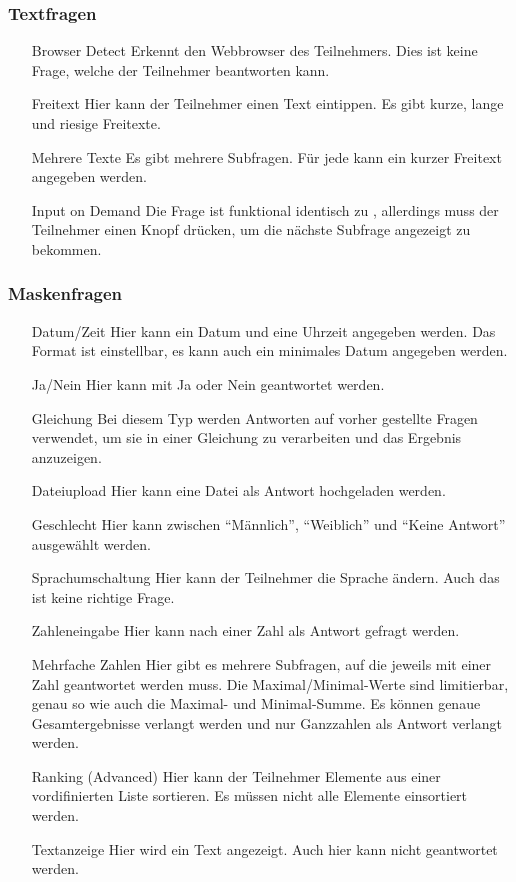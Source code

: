 \subsubsection{Textfragen}

\begin{itemize}
	\item[Browser Detect] Erkennt den Webbrowser des Teilnehmers. Dies ist keine Frage, welche der Teilnehmer beantworten kann.
	\item[Freitext] Hier kann der Teilnehmer einen Text eintippen. Es gibt kurze, lange und riesige Freitexte.
	\item[Mehrere Texte] Es gibt mehrere Subfragen. Für jede kann ein kurzer Freitext angegeben werden.
	\item[Input on Demand] Die Frage ist funktional identisch zu , allerdings muss der Teilnehmer einen Knopf drücken, um die nächste Subfrage angezeigt zu bekommen.
\end{itemize}

\subsubsection{Maskenfragen}

\begin{itemize}
	\item[Datum/Zeit] Hier kann ein Datum und eine Uhrzeit angegeben werden. Das Format ist einstellbar, es kann auch ein minimales Datum angegeben werden.
	\item[Ja/Nein] Hier kann mit Ja oder Nein geantwortet werden.
	\item[Gleichung] Bei diesem Typ werden Antworten auf vorher gestellte Fragen verwendet, um sie in einer Gleichung zu verarbeiten und das Ergebnis anzuzeigen.
	\item[Dateiupload] Hier kann eine Datei als Antwort hochgeladen werden.
	\item[Geschlecht] Hier kann zwischen \enquote{Männlich}, \enquote{Weiblich} und \enquote{Keine Antwort} ausgewählt werden.
	\item[Sprachumschaltung] Hier kann der Teilnehmer die Sprache ändern. Auch das ist keine richtige Frage.
	\item[Zahleneingabe] Hier kann nach einer Zahl als Antwort gefragt werden.
	\item[Mehrfache Zahlen] Hier gibt es mehrere Subfragen, auf die jeweils mit einer Zahl geantwortet werden muss. Die Maximal/Minimal-Werte sind limitierbar, genau so wie auch die Maximal- und Minimal-Summe. Es können genaue Gesamtergebnisse verlangt werden und nur Ganzzahlen als Antwort verlangt werden.
	\item[Ranking (Advanced)] Hier kann der Teilnehmer Elemente aus einer vordifinierten Liste sortieren. Es müssen nicht alle Elemente einsortiert werden.
	\item[Textanzeige] Hier wird ein Text angezeigt. Auch hier kann nicht geantwortet werden.
\end{itemize}

